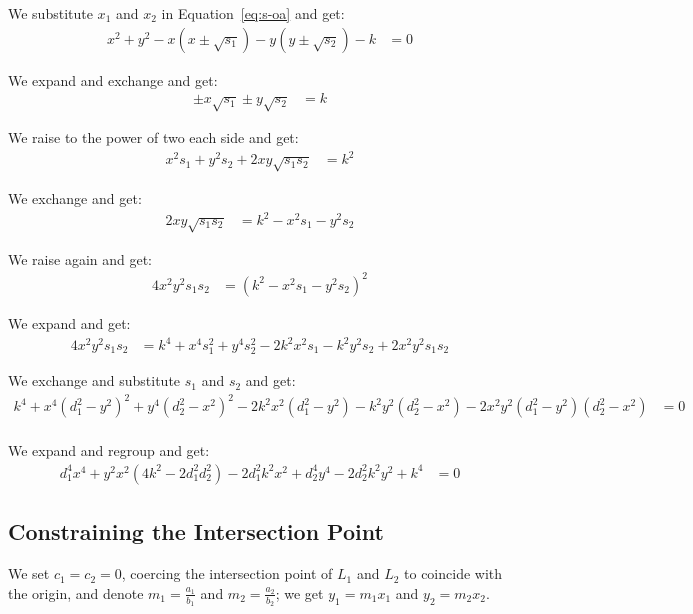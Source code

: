 \noindent
We substitute $x_1$ and $x_2$ in Equation~\ref{eq:s-oa} and get:
\begin{align*}
  x^2 + y^2 - x (x \pm \sqrt{s_1}) - y (y \pm \sqrt{s_2}) - k &= 0
\end{align*}

\noindent
We expand and exchange and get:
\begin{align*}
  \pm x \sqrt{s_1} \pm y \sqrt{s_2} &= k
\end{align*}

\noindent
We raise to the power of two each side and get:
\begin{align*}
  x^2 s_1 + y^2 s_2 + 2 x y \sqrt{s_1 s_2} &= k^2
\end{align*}

\noindent
We exchange and get:
\begin{align*}
  2 x y \sqrt{s_1 s_2} &= k^2 - x^2 s_1 - y^2 s_2
\end{align*}

\noindent
We raise again and get:
\begin{align*}
  4 x^2 y^2 s_1 s_2 &= (k^2 - x^2 s_1 - y^2 s_2)^2
\end{align*}

\noindent
We expand and get:
\begin{align*}
  4 x^2 y^2 s_1 s_2 &= k^4 + x^4 s_1^2 + y^4 s_2^2 - 2 k^2 x^2 s_1 - k^2 y^2 s_2 + 2 x^2 y^2 s_1 s_2
\end{align*}

\noindent
We exchange and substitute $s_1$ and $s_2$ and get:
\begin{align*}
  k^4 + x^4 (d_1^2 - y^2)^2 + y^4 (d_2^2 - x^2)^2 - 2 k^2 x^2 (d_1^2 - y^2) - k^2 y^2 (d_2^2 - x^2) - 2 x^2 y^2 (d_1^2 - y^2) (d_2^2 - x^2) &= 0\\
\end{align*}

\noindent
We expand and regroup and get:
\begin{align}
  d_1^4 x^4 + y^2 x^2 (4 k^2 - 2 d_1^2 d_2^2) - 2 d_1^2 k^2 x^2 + d_2^4 y^4 - 2 d_2^2 k^2 y^2 + k^4 &= 0\label{eq:oa}
\end{align}

\subsection{Constraining the Intersection Point}
\label{ssec:derivation-constraining-origin}
\setlength{\parskip}{1ex}
We set $c_1 = c_2 = 0$, coercing the intersection point of $L_1$ and $L_2$ to coincide with the origin, and denote $m_1 = \frac{a_1}{b_1}$ and $m_2 = \frac{a_2}{b_2}$; we get $y_1 = m_1 x_1$ and $y_2 = m_2 x_2$.

